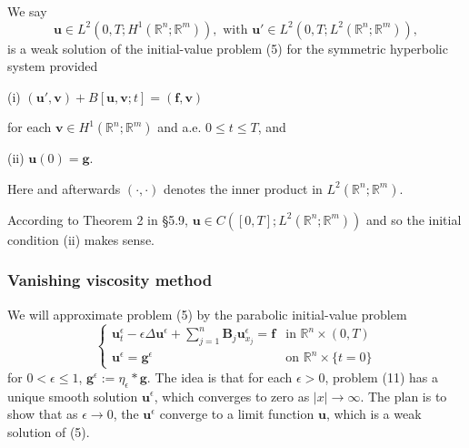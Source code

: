\begin{definition}
\label{def:weak-solution-symmetric-hyperbolic-system}
We say
\[
\mathbf{u} \in L^2(0,T; H^1(\mathbb{R}^n; \mathbb{R}^m)), \text{ with } \mathbf{u}' \in L^2(0,T; L^2(\mathbb{R}^n; \mathbb{R}^m)),
\]
is a weak solution of the initial-value problem (5) for the symmetric hyperbolic system provided

(i) $(\mathbf{u}',\mathbf{v}) + B[\mathbf{u},\mathbf{v};t] = (\mathbf{f},\mathbf{v})$

for each $\mathbf{v} \in H^1(\mathbb{R}^n; \mathbb{R}^m)$ and a.e. $0 \le t \le T$, and

(ii) $\mathbf{u}(0) = \mathbf{g}$.

Here and afterwards $(\cdot, \cdot)$ denotes the inner product in $L^2(\mathbb{R}^n; \mathbb{R}^m)$.
\end{definition}

\begin{remark}
\label{rem:weak-solution-symmetric-hyperbolic-continuity}
According to Theorem 2 in \S5.9, $\mathbf{u} \in C([0,T]; L^2(\mathbb{R}^n; \mathbb{R}^m))$ and so the initial condition (ii) makes sense.
\end{remark}

\subsubsection{Vanishing viscosity method}

We will approximate problem (5) by the parabolic initial-value problem
\[
\begin{cases}
\mathbf{u}_t^\epsilon - \epsilon \Delta \mathbf{u}^\epsilon + \sum_{j=1}^n \mathbf{B}_j \mathbf{u}_{x_j}^\epsilon = \mathbf{f} & \text{in } \mathbb{R}^n \times (0,T) \\
\mathbf{u}^\epsilon = \mathbf{g}^\epsilon & \text{on } \mathbb{R}^n \times \{t=0\}
\end{cases}
\tag{11}
\]
for $0 < \epsilon \le 1$, $\mathbf{g}^\epsilon := \eta_\epsilon * \mathbf{g}$. The idea is that for each $\epsilon > 0$, problem (11) has a unique smooth solution $\mathbf{u}^\epsilon$, which converges to zero as $|x| \to \infty$. The plan is to show that as $\epsilon \to 0$, the $\mathbf{u}^\epsilon$ converge to a limit function $\mathbf{u}$, which is a weak solution of (5).

